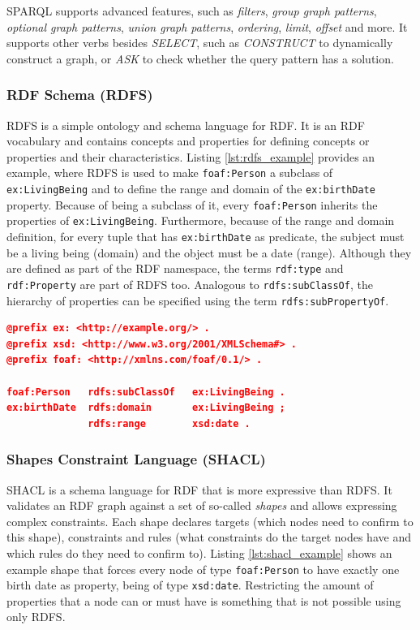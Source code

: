 SPARQL supports advanced features, such as \textit{filters}, \textit{group graph patterns}, \textit{optional graph patterns}, \textit{union graph patterns}, \textit{ordering}, \textit{limit}, \textit{offset} and more.
It supports other verbs besides \textit{SELECT}, such as \textit{CONSTRUCT} to dynamically construct a graph, or \textit{ASK} to check whether the query pattern has a solution.


\subsubsection{RDF Schema (RDFS)}
RDFS\cite{RDFS} is a simple ontology and schema language for RDF. 
It is an RDF vocabulary and contains concepts and properties for defining concepts or properties and their characteristics.
Listing \ref{lst:rdfs_example} provides an example, where RDFS is used to make \texttt{foaf:Person} a subclass of \texttt{ex:LivingBeing} and to define the range and domain of the \texttt{ex:birthDate} property.
Because of being a subclass of it, every \texttt{foaf:Person} inherits the properties of \texttt{ex:LivingBeing}.
Furthermore, because of the range and domain definition, for every tuple that has \texttt{ex:birthDate} as predicate, the subject must be a living being (domain) and the object must be a date (range).
Although they are defined as part of the RDF namespace, the terms \texttt{rdf:type} and \texttt{rdf:Property} are part of RDFS too.
Analogous to \texttt{rdfs:subClassOf}, the hierarchy of properties can be specified using the term \texttt{rdfs:subPropertyOf}.

\begin{lstlisting}[language=json,basicstyle=\scriptsize,firstnumber=1,caption={RDFS example},captionpos=b,label={lst:rdfs_example}]
@prefix ex: <http://example.org/> .
@prefix xsd: <http://www.w3.org/2001/XMLSchema#> .
@prefix foaf: <http://xmlns.com/foaf/0.1/> .

foaf:Person   rdfs:subClassOf   ex:LivingBeing .
ex:birthDate  rdfs:domain       ex:LivingBeing ;
              rdfs:range        xsd:date .
\end{lstlisting}

\subsubsection{Shapes Constraint Language (SHACL)}
SHACL\cite{SHACL} is a schema language for RDF that is more expressive than RDFS.
It validates an RDF graph against a set of so-called \textit{shapes} and allows expressing complex constraints.
Each shape declares targets (which nodes need to confirm to this shape), constraints and rules (what constraints do the target nodes have and which rules do they need to confirm to).
Listing \ref{lst:shacl_example} shows an example shape that forces every node of type \texttt{foaf:Person} to have exactly one birth date as property, being of type \texttt{xsd:date}.
Restricting the amount of properties that a node can or must have is something that is not possible using only RDFS.

